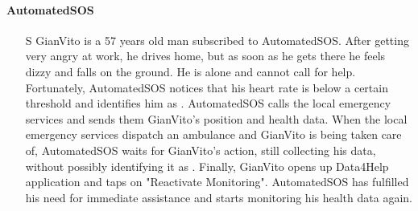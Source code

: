 \documentclass[../../rasd.tex]{subfiles}
\begin{document}
                \paragraph{AutomatedSOS}
                \begin{itemize}
                    \item[S\subs{7}] GianVito is a 57 years old man subscribed to AutomatedSOS. After getting very angry at work, he drives home, but as soon as he gets there he feels dizzy and falls on the ground. He is alone and cannot call for help. Fortunately, AutomatedSOS notices that his heart rate is below a certain threshold and identifies him as . AutomatedSOS calls the local emergency services and sends them GianVito's position and health data. When the local emergency services dispatch an ambulance and GianVito is being taken care of, AutomatedSOS waits for GianVito's action, still collecting his data, without possibly identifying it as . Finally, GianVito opens up Data4Help application and taps on "Reactivate Monitoring". AutomatedSOS has fulfilled his need for immediate assistance and starts monitoring his health data again.
                \end{itemize}
\end{document}
